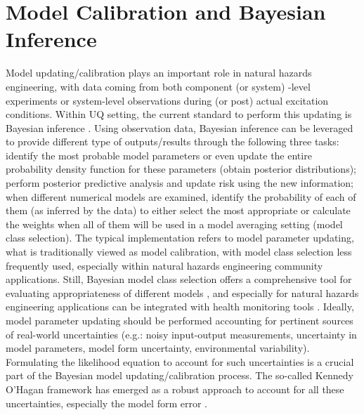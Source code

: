 \section{Model Calibration and Bayesian Inference}
\label{sec:uq_calibration}

Model updating/calibration plays an important role in natural hazards engineering, with data coming from both component (or system) -level experiments or system-level observations during (or post) actual excitation conditions. Within UQ setting, the current standard to perform this updating is Bayesian inference \citep{beck2010bayesian,kontoroupi2017online}. Using observation data, Bayesian inference can be leveraged to provide different type of outputs/results \citep{beck2013prior} through the following three tasks: identify the most probable model parameters or even update the entire probability density function for these parameters (obtain posterior distributions); perform posterior predictive analysis and update risk using the new information; when different numerical models are examined, identify the probability of each of them (as inferred by the data) to either select the most appropriate or calculate the weights when all of them will be used in a model averaging setting (model class selection). The typical implementation refers to model parameter updating, what is traditionally viewed as model calibration, with model class selection less frequently used, especially within natural hazards engineering community applications. Still, Bayesian model class selection offers a comprehensive tool for evaluating appropriateness of different models \citep{muto2008bayesian}, and especially for natural hazards engineering applications can be integrated with health monitoring tools \citep{oh2018bayesian}. Ideally, model parameter updating should be performed accounting for pertinent sources of real-world uncertainties (e.g.: noisy input-output measurements, uncertainty in model parameters, model form uncertainty, environmental variability). Formulating the likelihood equation to account for such uncertainties is a crucial part of the Bayesian model updating/calibration process. The so-called Kennedy O'Hagan framework has emerged as a robust approach to account for all these uncertainties, especially the model form error \citep{kennedy2001bayesian}. 

